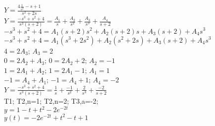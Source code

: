 \documentclass{article}
\begin{document}
\begin{enumerate}
\begin{enumerate}
\\$Y=\frac{4\frac{1}{s^2}-s+1}{s^2+2s}$
\\$Y=\frac{-s^3+s^2+4}{s^3(s+2)}=\frac{A_1}{s}+\frac{A_2}{s^2}+\frac{A_3}{s^3}+\frac{A_4}{s+2}$
\\$-s^3+s^2+4=A_1(s+2)s^2+A_2(s+2)s+A_3(s+2)+A_4s^3$
\\$-s^3+s^2+4=A_1(s^3+2s^2)+A_2(s^2+2s)+A_3(s+2)+A_4s^3$
\\$4=2A_3$; $A_3=2$
\\$0=2A_2+A_3$; $0=2A_2+2$; $A_2=-1$
\\$1=2A_1+A_2$; $1=2A_1-1$; $A_1=1$
\\$-1=A_4+A_1$; $-1=A_4+1$; $A_4=-2$
\\$Y=\frac{-s^3+s^2+4}{s^3(s+2)}=\frac{1}{s}+\frac{-1}{s^2}+\frac{2}{s^3}+\frac{-2}{s+2}$
\\T1; T2,n=1; T2,n=2; T3,a=-2; 
\\$y=1-t+t^2-2e^{-2t}$
\\$y(t)=-2e^{-2t}+t^2-t+1$
\end{enumerate}



\end{enumerate}
\end{document}
